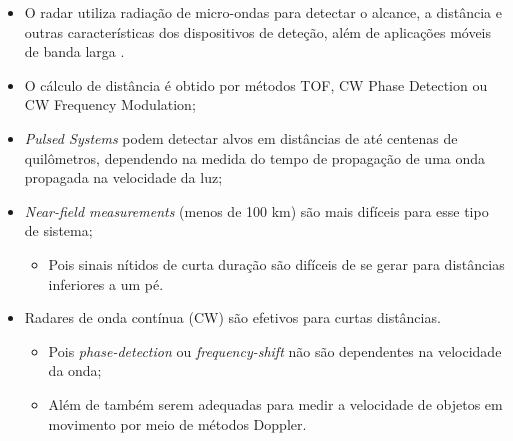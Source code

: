 \documentclass[xcolor=dvipsnames, aspectratio=169]{beamer}
\begin{document}
\begin{frame}
\begin{itemize}
    \newpage
    \item O radar utiliza radiação de micro-ondas para detectar o alcance, a distância e outras características dos dispositivos de deteção, além de aplicações móveis de banda larga \cite{Agarwal_2021}.
    \item O cálculo de distância é obtido por métodos TOF, CW Phase Detection ou CW Frequency Modulation;
    \item \textit{Pulsed Systems} podem detectar alvos em distâncias de até centenas de quilômetros, dependendo na medida do tempo de propagação de uma onda propagada na velocidade da luz;
    \item \textit{Near-field measurements} (menos de 100 km) são mais difíceis para esse tipo de sistema;
    \begin{itemize}
        \item Pois sinais nítidos de curta duração são difíceis de se gerar para distâncias inferiores a um pé.
    \end{itemize} 
    \item Radares de onda contínua (CW) são efetivos para curtas distâncias.
    \begin{itemize}
        \item Pois \textit{phase-detection} ou \textit{frequency-shift} não são dependentes na velocidade da onda;
        \item Além de também serem adequadas para medir a velocidade de objetos em movimento por meio de métodos Doppler.
    \end{itemize}
	\end{itemize}
	
\end{frame}
\end{document}
